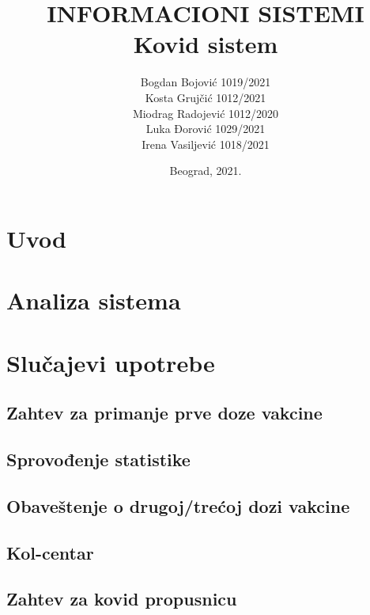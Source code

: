 \documentclass[titlepage]{article}
\title{INFORMACIONI SISTEMI\\Kovid sistem}
\author{
Bogdan Bojović 1019/2021\\
Kosta Grujčić 1012/2021\\
Miodrag Radojević 1012/2020\\
Luka Đorović 1029/2021\\
Irena Vasiljević 1018/2021
}
\date{Beograd, 2021.}
\begin{document}
\maketitle
\tableofcontents

\newpage

\section{Uvod}

\section{Analiza sistema}

\section{Slučajevi upotrebe}

\subsection{Zahtev za primanje prve doze vakcine}

\subsection{Sprovođenje statistike}

\subsection{Obaveštenje o drugoj/trećoj dozi vakcine}

\subsection{Kol-centar}

\subsection{Zahtev za kovid propusnicu}
\end{document}

